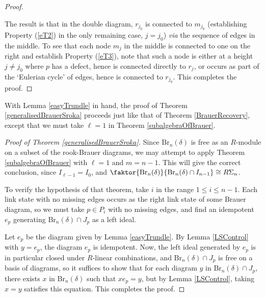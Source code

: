 \documentclass[12pt]{amsart}
\theoremstyle{plain}
\theoremstyle{definition} \newtheorem{definition}[theorem]{Definition}
\theoremstyle{plain}
\theoremstyle{plain} \newtheorem{proposition}[theorem]{Proposition}
\theoremstyle{plain} \newtheorem{conjecture}[theorem]{Conjecture}
\theoremstyle{plain} \newtheorem{corollary}[theorem]{Corollary}
\theoremstyle{remark} \newtheorem{claim}[theorem]{Claim}
\theoremstyle{remark} \newtheorem{remark}[theorem]{Remark}
\theoremstyle{remark} \newtheorem{example}[theorem]{Example}
\theoremstyle{remark} \newtheorem{comment}[theorem]{Comment}
\theoremstyle{definition} \newtheorem{question}[theorem]{Question}
\newcommand{\Brauer}{\mathrm{Br}}
\begin{document}
\begin{proof}
\begin{center}
\quad
\end{center}

The result is that in the double diagram, $r_{j_0}$ is connected to $m_{j_0}$ (establishing Property (\ref{eT2}) in the only remaining case, $j=j_0$) \emph{via} the sequence of edges in the middle. To see that each node $m_j$ in the middle is connected to one on the right and establish Property (\ref{eT3}), note that such a node is either at a height $j \neq j_0$ where $p$ has a defect, hence is connected directly to $r_j$, or occurs as part of the `Eulerian cycle' of edges, hence is connected to $r_{j_0}$. This completes the proof. \end{proof}

With Lemma \ref{easyTrundle} in hand, the proof of Theorem \ref{generalisedBrauerSroka} proceeds just like that of Theorem \ref{BrauerRecovery}, except that we must take $\ell = 1$ in Theorem \ref{subalgebraOfBrauer}.

\begin{proof}[Proof of Theorem \ref{generalisedBrauerSroka}] Since $\Brauer_n(\delta)$ is free as an $R$-module on a subset of the rook-Brauer diagrams, we may attempt to apply Theorem \ref{subalgebraOfBrauer} with $\ell = 1$ and $m = n-1$. This will give the correct conclusion, since $I_{\ell-1}=I_0$, and $\faktor{\Brauer_n(\delta)}{\Brauer_n(\delta) \cap I_{n-1}} \cong R \Sigma_n$.

To verify the hypothesis of that theorem, take $i$ in the range $1 \leq i \leq n-1$. Each link state with no missing edges occurs as the right link state of some Brauer diagram, so we must take $p \in P_i$ with no missing edges, and find an idempotent $e_p$ generating $\Brauer_n(\delta) \cap J_p$ as a left ideal.

Let $e_p$ be the diagram given by Lemma \ref{easyTrundle}. By Lemma \ref{LSControl} with $y=e_p$, the diagram $e_p$ is idempotent. Now, the left ideal generated by $e_p$ is in particular closed under $R$-linear combinations, and $\Brauer_n(\delta) \cap J_p$ is free on a basis of diagrams, so it suffices to show that for each diagram $y$ in $\Brauer_n(\delta) \cap J_p$, there exists $x$ in $\Brauer_n(\delta)$ such that $x e_p = y$, but by Lemma \ref{LSControl}, taking $x=y$ satisfies this equation. This completes the proof. \end{proof}
\end{document}

